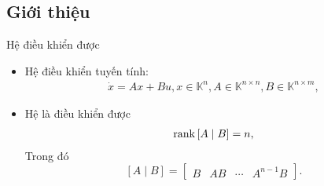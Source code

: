 \subsection{Giới thiệu}
\begin{frame}{Hệ điều khiển được}
    \begin{itemize}
        \item Hệ điều khiển tuyến tính:
        \begin{align}
            \dot{x}=Ax+Bu,x\in\mathbb{K}^{n},A\in\mathbb{K}^{n\times n},B\in\mathbb{K}^{n\times m},
        \end{align}
        \item Hệ là điều khiển được
        \begin{align}
            \operatorname{rank}\left[A\mid B\right]=n,
        \end{align}
        Trong đó
        \begin{equation}
        \left[A\mid B\right]=\left[\begin{array}{cccc}
        B & AB & \cdots & A^{n-1}B\end{array}\right].    
        \end{equation}
    \end{itemize}
\end{frame}
